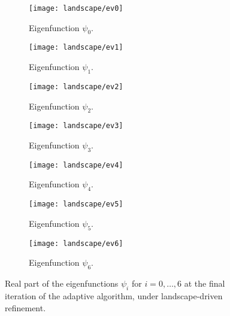 \documentclass[12pt]{amsart}
\begin{document}
\begin{figure}[htbp]
    \begin{subfigure}[t]{0.49\textwidth}
        \centering
        \texttt{[image: landscape/ev0]}
        \caption{Eigenfunction \(\psi_0\).}
        \label{fig:eigenfunction_0}
    \end{subfigure}
    \begin{subfigure}[t]{0.49\textwidth}
        \centering
        \texttt{[image: landscape/ev1]}
        \caption{Eigenfunction \(\psi_1\).}
        \label{fig:eigenfunction_1}
    \end{subfigure}
    \vspace{1cm}
    \begin{subfigure}[t]{0.49\textwidth}
        \centering
        \texttt{[image: landscape/ev2]}
        \caption{Eigenfunction \(\psi_2\).}
        \label{fig:eigenfunction_2}
    \end{subfigure}
    \begin{subfigure}[t]{0.49\textwidth}
        \centering
        \texttt{[image: landscape/ev3]}
        \caption{Eigenfunction \(\psi_3\).}
        \label{fig:eigenfunction_3}
    \end{subfigure}
    \vspace{1cm}
    \begin{subfigure}[t]{0.49\textwidth}
        \centering
        \texttt{[image: landscape/ev4]}
        \caption{Eigenfunction \(\psi_4\).}
        \label{fig:eigenfunction_4}
    \end{subfigure}
    \begin{subfigure}[t]{0.49\textwidth}
        \centering
        \texttt{[image: landscape/ev5]}
        \caption{Eigenfunction \(\psi_5\).}
        \label{fig:eigenfunction_5}
    \end{subfigure}
    \vspace{1cm}
    \begin{subfigure}[t]{0.49\textwidth}
        \centering
        \texttt{[image: landscape/ev6]}
        \caption{Eigenfunction \(\psi_6\).}
        \label{fig:eigenfunction_6}
    \end{subfigure}
    \caption{Real part of the eigenfunctions \(\psi_i\) for \(i = 0, \ldots, 6\) at the final iteration of the adaptive algorithm, under landscape-driven refinement.}
\end{figure}
\end{document}
